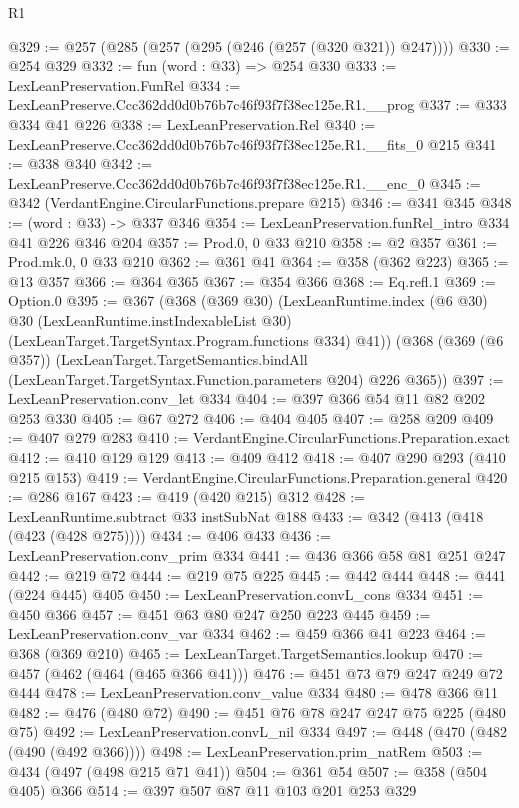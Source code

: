 \begin{lexlean}{R1}
\begin{coremodule}
@329 := @257 (@285 (@257 (@295 (@246 (@257 (@320 @321)) @247))))
@330 := @254 @329
@332 := fun (word : @33) => @254 @330
@333 := LexLeanPreservation.FunRel
@334 := LexLeanPreserve.Ccc362dd0d0b76b7c46f93f7f38ec125e.R1.__prog
@337 := @333 @334 @41 @226
@338 := LexLeanPreservation.Rel
@340 := LexLeanPreserve.Ccc362dd0d0b76b7c46f93f7f38ec125e.R1.__fits_0 @215
@341 := @338 @340
@342 := LexLeanPreserve.Ccc362dd0d0b76b7c46f93f7f38ec125e.R1.__enc_0
@345 := @342 (VerdantEngine.CircularFunctions.prepare @215)
@346 := @341 @345
@348 := (word : @33) -> @337 @346
@354 := LexLeanPreservation.funRel_intro @334 @41 @226 @346 @204
@357 := Prod.{0, 0} @33 @210
@358 := @2 @357
@361 := Prod.mk.{0, 0} @33 @210
@362 := @361 @41
@364 := @358 (@362 @223)
@365 := @13 @357
@366 := @364 @365
@367 := @354 @366
@368 := Eq.refl.{1}
@369 := Option.{0}
@395 := @367
    (@368
      (@369 @30)
      (LexLeanRuntime.index
        (@6 @30)
        @30
        (LexLeanRuntime.instIndexableList @30)
        (LexLeanTarget.TargetSyntax.Program.functions @334)
        @41))
    (@368
      (@369 (@6 @357))
      (LexLeanTarget.TargetSemantics.bindAll
        (LexLeanTarget.TargetSyntax.Function.parameters @204)
        @226
        @365))
@397 := LexLeanPreservation.conv_let @334
@404 := @397 @366 @54 @11 @82 @202 @253 @330
@405 := @67 @272
@406 := @404 @405
@407 := @258 @209
@409 := @407 @279 @283
@410 := VerdantEngine.CircularFunctions.Preparation.exact
@412 := @410 @129 @129
@413 := @409 @412
@418 := @407 @290 @293 (@410 @215 @153)
@419 := VerdantEngine.CircularFunctions.Preparation.general
@420 := @286 @167
@423 := @419 (@420 @215) @312
@428 := LexLeanRuntime.subtract @33 instSubNat @188
@433 := @342 (@413 (@418 (@423 (@428 @275))))
@434 := @406 @433
@436 := LexLeanPreservation.conv_prim @334
@441 := @436 @366 @58 @81 @251 @247
@442 := @219 @72
@444 := @219 @75 @225
@445 := @442 @444
@448 := @441 (@224 @445) @405
@450 := LexLeanPreservation.convL_cons @334
@451 := @450 @366
@457 := @451 @63 @80 @247 @250 @223 @445
@459 := LexLeanPreservation.conv_var @334
@462 := @459 @366 @41 @223
@464 := @368 (@369 @210)
@465 := LexLeanTarget.TargetSemantics.lookup
@470 := @457 (@462 (@464 (@465 @366 @41)))
@476 := @451 @73 @79 @247 @249 @72 @444
@478 := LexLeanPreservation.conv_value @334
@480 := @478 @366 @11
@482 := @476 (@480 @72)
@490 := @451 @76 @78 @247 @247 @75 @225 (@480 @75)
@492 := LexLeanPreservation.convL_nil @334
@497 := @448 (@470 (@482 (@490 (@492 @366))))
@498 := LexLeanPreservation.prim_natRem
@503 := @434 (@497 (@498 @215 @71 @41))
@504 := @361 @54
@507 := @358 (@504 @405) @366
@514 := @397 @507 @87 @11 @103 @201 @253 @329

\end{coremodule}
\end{lexlean}
